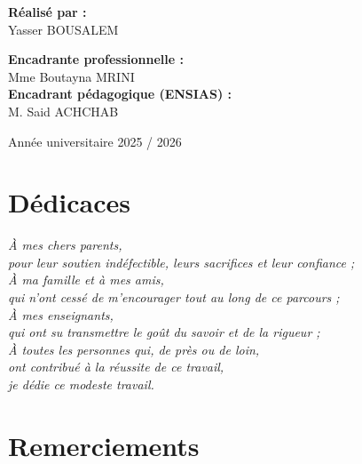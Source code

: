 \documentclass[12pt,a4paper,oneside]{report}
\begin{document}
\begin{titlepage}
\begin{center}
\begin{minipage}[t]{0.48\textwidth}
\begin{flushleft}
\textbf{Réalisé par :}\\[3pt]
Yasser BOUSALEM
\end{flushleft}
\end{minipage}
\hfill
\begin{minipage}[t]{0.48\textwidth}
\begin{flushright}
\textbf{Encadrante professionnelle :}\\[3pt]
Mme Boutayna MRINI\\[10pt]
\textbf{Encadrant pédagogique (ENSIAS) :}\\[3pt]
M. Said ACHCHAB
\end{flushright}
\end{minipage}

\vfill
{\large Année universitaire 2025 / 2026}

\end{center}
\end{titlepage}

\chapter*{Dédicaces}
\thispagestyle{empty}

\begin{flushright}\itshape
À mes chers parents,\\
pour leur soutien indéfectible, leurs sacrifices et leur confiance ;\\[10pt]
À ma famille et à mes amis,\\
qui n'ont cessé de m'encourager tout au long de ce parcours ;\\[10pt]
À mes enseignants,\\
qui ont su transmettre le goût du savoir et de la rigueur ;\\[10pt]
À toutes les personnes qui, de près ou de loin,\\
ont contribué à la réussite de ce travail,\\[10pt]
je dédie ce modeste travail.
\end{flushright}

\chapter*{Remerciements}
\end{document}
